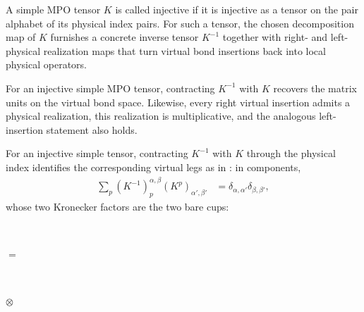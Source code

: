 \begin{definition}
    \label{def:mpdo_injective_inverse_layer}
    \leanok
    A simple MPO tensor $K$ is called injective if it is injective as a tensor
    on the pair alphabet of its physical index pairs. For such a tensor, the
    chosen decomposition map of $K$ furnishes a concrete inverse tensor $K^{-1}$ together
    with right- and left-physical realization maps that turn virtual bond
    insertions back into local physical operators.
\end{definition}

\begin{lemma}
    \label{thm:mpdo_injective_inverse_layer_spec}
    \leanok
    For an injective simple MPO tensor, contracting $K^{-1}$ with $K$ recovers
    the matrix units on the virtual bond space. Likewise, every right virtual
    insertion admits a physical realization, this realization is multiplicative,
    and the analogous left-insertion statement also holds.
\end{lemma}

For an injective simple tensor, contracting $K^{-1}$ with $K$ through the
physical index identifies the corresponding virtual legs as in
\cite[Appendix~C.2, lines~1376--1380]{Cirac2016MPDO_arXiv}: in components,
\begin{align}
    \sum_p(K^{-1})^{\alpha,\beta}_p(K^p)_{\alpha',\beta'}
     & =\delta_{\alpha,\alpha'}\delta_{\beta,\beta'},
    \label{eq:rfp_inverse_matrix_units}
\end{align}
whose two Kronecker factors are the two bare cups:
\begin{tenkzequation}
    \tenkzkernel
    \begin{tenkz}[rows={ket,bra}, cols=1]
         \\
    \end{tenkz}
    $ = $
    \begin{tenkz}[rows={wire,wire}, cols=1, west=open, east=cup, bonds=none]
        \tn[skin=none]{} \\ \tn[skin=none]{}
    \end{tenkz}
    $ \otimes $
    \begin{tenkz}[rows={wire,wire}, cols=1, west=cup, east=open, bonds=none]
        \tn[skin=none]{} \\ \tn[skin=none]{}
    \end{tenkz}
\end{tenkzequation}

